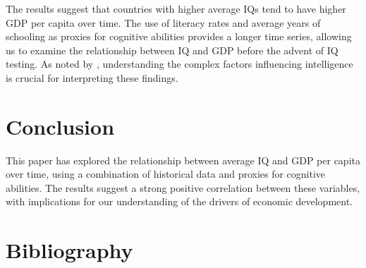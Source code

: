 \documentclass{article}
\begin{document}
The results suggest that countries with higher average IQs tend to have higher GDP per capita over time. The use of literacy rates and average years of schooling as proxies for cognitive abilities provides a longer time series, allowing us to examine the relationship between IQ and GDP before the advent of IQ testing. As noted by \cite{neisser1996intelligence}, understanding the complex factors influencing intelligence is crucial for interpreting these findings.

\section{Conclusion}

This paper has explored the relationship between average IQ and GDP per capita over time, using a combination of historical data and proxies for cognitive abilities. The results suggest a strong positive correlation between these variables, with implications for our understanding of the drivers of economic development.

\section{Bibliography}



\end{document}
